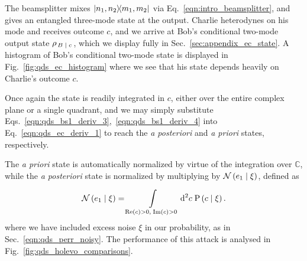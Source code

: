 The beamsplitter mixes $\dyad{n_1, n_2}{m_1, m_2}$ via Eq.~\ref{eqn:intro_beamsplitter}, and gives an entangled three-mode state at the output. Charlie heterodynes on his mode and receives outcome $c$, and we arrive at Bob's conditional two-mode output state $\rho_{\left. B \; \middle| \; c\right.}$, which we display fully in Sec.~\ref{sec:appendix_ec_state}. A histogram of Bob's conditional two-mode state is displayed in Fig.~\ref{fig:qds_ec_histogram} where we see that his state depends heavily on Charlie's outcome $c$. 

\iffalse
\begin{align}\label{eqn:qds_ec_deriv_1}
&\tilde{\rho}_{B}\left(c\right) =  \frac{e^{-\left|\alpha_k\right|^2}}{\cosh^2\zeta} \frac{1}{\pi} \sum_{n_1, m_1, n_2, m_2 = 0}^\infty \alpha_k^{n_1} \overline{\alpha_k}^{m_1} \left(\tanh\zeta\right)^{n_2 + m_2} \sum_{k_1, k_2, l_1, l_2 = 0}^{n_1, n_2, m_1, m_2}  \notag \\
%
&\sqrt{n_2! m_2!} \left(\sqrt{T}\right)^{k_1 + l_1} \left(\sqrt{1-T}\right)^{n_1 + m_1 - k_1 - l_1} \left(-\sqrt{1-T}\right)^{k_2 + l_2} \left(\sqrt{T}\right)^{n_2 + m_2 - k_2 - l_2} \notag \\
%
&\times \sqrt{\left(n_1 + n_2 - k_1 - k_2\right)! \left(m_1 + m_2 - l_1 - l_2\right)} \notag \\
%
&\times \left[k_1! k_2! l_1! l_2! \left(n_1 - k_1\right)! \left(n_2 - k_2\right)! \left(m_1 - l_1\right)! \left(m_2 - l_2\right)! \right]^{-1} \notag \\
%
&\times \dyad{n_1 + n_2 - k_1 - k_2}{m-1 + m_2 - l_1 - l_2} \otimes \dyad{n_2}{m_2} \notag \\
%
&\times \left[e^{-\left|c\right|^2} c^{k_1 + k_2} \overline{c}^{l_1 + l_2} \right]
\end{align}

\noindent where we have again separated the terms involving $c$. 
\fi


Once again the state is readily integrated in $c$, either over the entire complex plane or a single quadrant, and we may simply substitute Eqs.~\ref{eqn:qds_bs1_deriv_3},~\ref{eqn:qds_bs1_deriv_4} into Eq.~\ref{eqn:qds_ec_deriv_1} to reach the \emph{a posteriori} and \emph{a priori} states, respectively.

The \emph{a priori} state is automatically normalized by virtue of the integration over $\mathbb{C}$, while the \emph{a posteriori} state is normalized by multiplying by $\mathcal{N}\left(e_1 \; \middle| \; \xi \right)$, defined as 

\begin{equation}
\mathcal{N}\left(e_1 \; \middle| \; \xi\right) = \int\limits_{\text{Re}\left(c\right) > 0, \; \text{Im}\left(c\right)>0} \mathop{}\!\mathrm{d^2} c \; \text{P}\left(c \; \middle| \; \xi \right).
\end{equation}
where we have included excess noise $\xi$ in our probability, as in Sec.~\ref{eqn:qds_perr_noisy}. The performance of this attack is analysed in Fig.~\ref{fig:qds_holevo_comparisons}.

